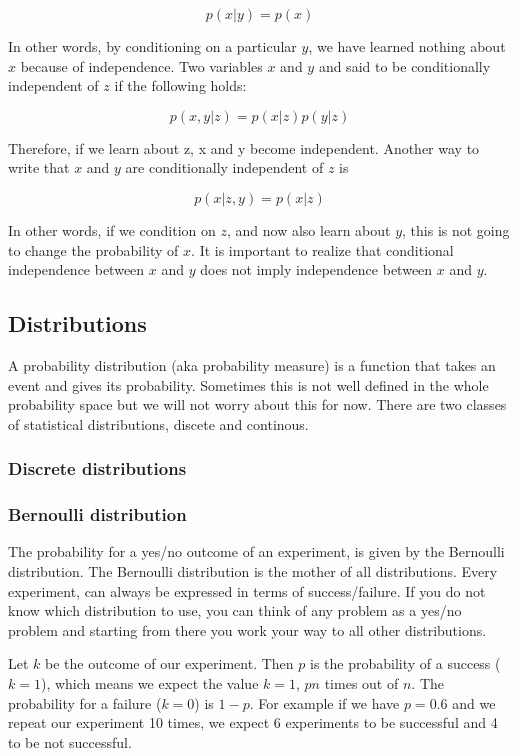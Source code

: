 \documentclass[11pt]{article}
\begin{document}
\[ p(x|y) = p(x) \]

In other words, by conditioning on a particular \(y\), we have learned
nothing about \(x\) because of independence. Two variables \(x\) and
\(y\) and said to be conditionally independent of \(z\) if the following
holds:

\[ p(x,y|z) = p(x|z) p(y|z) \]

Therefore, if we learn about z, x and y become independent. Another way
to write that \(x\) and \(y\) are conditionally independent of \(z\) is

\[ p(x| z, y) = p(x|z) \]

In other words, if we condition on \(z\), and now also learn about
\(y\), this is not going to change the probability of \(x\). It is
important to realize that conditional independence between \(x\) and
\(y\) does not imply independence between \(x\) and \(y\).

    \subsection{Distributions}\label{distributions}

A probability distribution (aka probability measure) is a function that
takes an event and gives its probability. Sometimes this is not well
defined in the whole probability space but we will not worry about this
for now. There are two classes of statistical distributions, discete and
continous.

    \subsubsection{Discrete distributions}\label{discrete-distributions}

    \subsubsection{Bernoulli distribution}\label{bernoulli-distribution}

The probability for a yes/no outcome of an experiment, is given by the
Bernoulli distribution. The Bernoulli distribution is the mother of all
distributions. Every experiment, can always be expressed in terms of
success/failure. If you do not know which distribution to use, you can
think of any problem as a yes/no problem and starting from there you
work your way to all other distributions.

Let \(k\) be the outcome of our experiment. Then \(p\) is the
probability of a success (\(k=1\)), which means we expect the value
\(k=1\), \(p n\) times out of \(n\). The probability for a failure
(\(k=0\)) is \(1-p\). For example if we have \(p=0.6\) and we repeat our
experiment 10 times, we expect 6 experiments to be successful and 4 to
be not successful.
\end{document}
